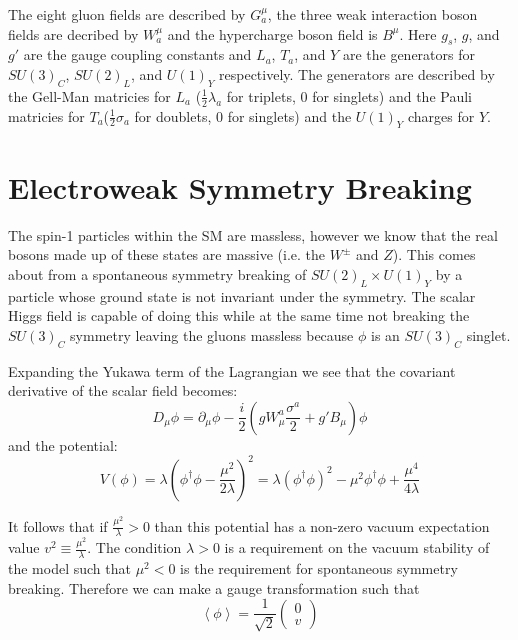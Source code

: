 The eight gluon fields are described by $G^{\mu}_a$, the three weak interaction boson fields are decribed by $W^{\mu}_a$ and the hypercharge boson field is $B^{\mu}$.  Here $g_s$, $g$, and $g'$ are the gauge coupling constants and $L_a$, $T_a$, and $Y$ are the generators for $SU(3)_C$, $SU(2)_L$, and $U(1)_Y$ respectively.   The generators are described by the Gell-Man matricies for $L_a$ ($\frac{1}{2}\lambda_a$ for triplets, 0 for singlets) and the Pauli matricies for $T_a$($\frac{1}{2}\sigma_a$ for doublets, 0 for singlets) and the $U(1)_Y$ charges for $Y$.


\section{Electroweak Symmetry Breaking}
\label{sec:EWSB}
  The spin-1 particles within the SM are massless, however we know that the real bosons made up of these states are massive (i.e. the $W^\pm$ and $Z$).  This comes about from a spontaneous symmetry breaking of $SU(2)_L \times U(1)_Y$ by a particle whose ground state is not invariant under the symmetry.  The scalar Higgs field is capable of doing this while at the same time not breaking the $SU(3)_C$ symmetry leaving the gluons massless because $\phi$ is an $SU(3)_C$ singlet.

Expanding the Yukawa term of the Lagrangian we see that the covariant derivative of the scalar field becomes:
\[ D_{\mu} \phi = \partial_\mu \phi - \frac{i}{2}(gW_{\mu}^{a} \frac{\sigma^a}{2}+g' B_\mu)\phi
\]
and the potential:
\[ V(\phi) = \lambda (\phi^{\dagger} \phi - \frac{\mu^2}{2 \lambda})^2 = \lambda(\phi^\dagger \phi)^2 -\mu^2 \phi^\dagger \phi + \frac{\mu^4}{4\lambda}
\]

It follows that if $\frac{\mu^2}{\lambda}>0$ than this potential has a non-zero vacuum expectation value $v^2 \equiv \frac{\mu^2}{\lambda}$.  The condition $\lambda>0$ is a requirement on the vacuum stability of the model such that $\mu^2 <0$ is the requirement for spontaneous symmetry breaking.  Therefore we can make a gauge transformation such that 
\[ \left<{\phi}\right>=\frac{1}{\sqrt{2}}\begin{pmatrix} 0\\v\end{pmatrix}
\]

